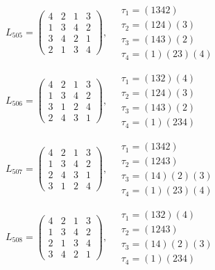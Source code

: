 $L_{505} = \begin{pmatrix} 4 & 2 & 1 & 3 \\ 1 & 3 & 4 & 2 \\ 3 & 4 & 2 & 1 \\ 2 & 1 & 3 & 4 \end{pmatrix}, \quad \begin{matrix} \tau_{1} = (1 3 4 2) \\ \tau_{2} = (1 2 4)(3) \\ \tau_{3} = (1 4 3)(2) \\ \tau_{4} = (1)(2 3)(4) \end{matrix}$

$L_{506} = \begin{pmatrix} 4 & 2 & 1 & 3 \\ 1 & 3 & 4 & 2 \\ 3 & 1 & 2 & 4 \\ 2 & 4 & 3 & 1 \end{pmatrix}, \quad \begin{matrix} \tau_{1} = (1 3 2)(4) \\ \tau_{2} = (1 2 4)(3) \\ \tau_{3} = (1 4 3)(2) \\ \tau_{4} = (1)(2 3 4) \end{matrix}$

$L_{507} = \begin{pmatrix} 4 & 2 & 1 & 3 \\ 1 & 3 & 4 & 2 \\ 2 & 4 & 3 & 1 \\ 3 & 1 & 2 & 4 \end{pmatrix}, \quad \begin{matrix} \tau_{1} = (1 3 4 2) \\ \tau_{2} = (1 2 4 3) \\ \tau_{3} = (1 4)(2)(3) \\ \tau_{4} = (1)(2 3)(4) \end{matrix}$

$L_{508} = \begin{pmatrix} 4 & 2 & 1 & 3 \\ 1 & 3 & 4 & 2 \\ 2 & 1 & 3 & 4 \\ 3 & 4 & 2 & 1 \end{pmatrix}, \quad \begin{matrix} \tau_{1} = (1 3 2)(4) \\ \tau_{2} = (1 2 4 3) \\ \tau_{3} = (1 4)(2)(3) \\ \tau_{4} = (1)(2 3 4) \end{matrix}$

